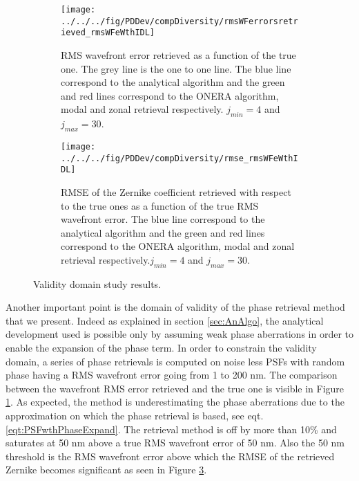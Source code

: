 \begin{figure}
\centering
    \begin{subfigure}{0.45\textwidth}
        \texttt{[image: ../../../fig/PDDev/compDiversity/rmsWFerrorsretrieved\_rmsWFeWthIDL]}
        \caption{RMS wavefront error retrieved as a function of the true one. The grey line is the one to one line. The blue line correspond to the analytical algorithm and the green and red lines correspond to the ONERA algorithm, modal and zonal retrieval respectively. $j_{min}=4$ and $j_{max}=30$.}
        \label{subfig:rmsWFerrorsretrieved_rmsWFeWthIDL}
    \end{subfigure}
    \quad
    \begin{subfigure}{0.45\textwidth}
        \texttt{[image: ../../../fig/PDDev/compDiversity/rmse\_rmsWFeWthIDL]}
        \caption{RMSE of the Zernike coefficient retrieved with respect to the true ones as a function of the true RMS wavefront error. The blue line correspond to the analytical algorithm and the green and red lines correspond to the ONERA algorithm, modal and zonal retrieval respectively.$j_{min}=4$ and $j_{max}=30$.}
        \label{subfig:rmse_rmsWFeWthIDL}
    \end{subfigure}
    \decoRule
    \caption{Validity domain study results.}
\end{figure}

Another important point is the domain of validity of the phase retrieval method that we present. Indeed as explained in section \ref{sec:AnAlgo}, the analytical development used is possible only by assuming weak phase aberrations in order to enable the expansion of the phase term. In order to constrain the validity domain, a series of phase retrievals is computed on noise less PSFs with random phase having a RMS wavefront error going from 1 to 200 nm. The comparison between the wavefront RMS error retrieved and the true one is visible in Figure \ref{subfig:rmsWFerrorsretrieved_rmsWFeWthIDL}. As expected, the method is underestimating the phase aberrations due to the approximation on which the phase retrieval is based, see eqt. \eqref{eqt:PSFwthPhaseExpand}. The retrieval method is off by more than 10\% and saturates at 50 nm above a true RMS wavefront error of 50 nm. Also the 50 nm threshold is the RMS wavefront error above which the RMSE of the retrieved Zernike becomes significant as seen in Figure \ref{subfig:rmse_rmsWFeWthIDL}.  